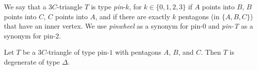 \begin{definition} We say that a $3C$-triangle $T$ is type {\it
    pin}-$k$, for $k\in \{0,1,2,3\}$ if $A$ points into $B$, $B$
  points into $C$, $C$ points into $A$, and if there are exactly $k$
  pentagons (in $\{A,B,C\}$) that have an inner vertex.  We use {\it
    pinwheel} as a synonym for pin-$0$ and {\it pin-T} as a synonym
  for pin-$2$.
\end{definition}


\begin{lemma} Let $T$ be a $3C$-triangle of type pin-$1$ with
  pentagons $A$, $B$, and $C$.  Then $T$ is degenerate of type
  $\Delta$.
\end{lemma}


